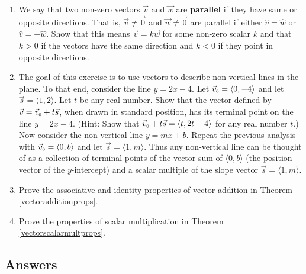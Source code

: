 \documentclass{ximera}
\begin{document}
\begin{enumerate}
\item We say that two non-zero vectors $\vec{v}$ and $\vec{w}$ are {\bf parallel} if they have same or opposite directions.  That is, $\vec{v} \neq \vec{0}$ and $\vec{w} \neq \vec{0}$ are parallel if either $\hat{v} = \hat{w}$ or $\hat{v} = -\hat{w}$.  Show that this means $\vec{v} = k\vec{w}$ for some non-zero scalar $k$ and that $k > 0$ if the vectors have the same direction and $k < 0$ if they point in opposite directions.
\label{parallelvectorexercise}

\item The goal of this exercise is to use vectors to describe non-vertical lines in the plane.  To that end, consider the line $y = 2x - 4$. Let $\vec{v}_{\text{\tiny $0$}} = \langle 0, -4 \rangle$ and let $\vec{s} = \langle 1, 2 \rangle$.  Let $t$ be any real number.  Show that the vector defined by $\vec{v} = \vec{v}_{\text{\tiny $0$}} + t\vec{s}$, when drawn in standard position, has its terminal point on the line $y = 2x - 4$.  (Hint: Show that $\vec{v}_{\text{\tiny $0$}} + t\vec{s} = \langle t, 2t - 4 \rangle$ for any real number $t$.)  Now consider the non-vertical line $y = mx + b$.  Repeat the previous analysis with  $\vec{v}_{\text{\tiny $0$}} = \langle 0, b \rangle$ and let $\vec{s} = \langle 1, m \rangle$.  Thus any non-vertical line can be thought of as a collection of terminal points of the vector sum of $\langle 0, b \rangle$ (the position vector of the $y$-intercept) and a scalar multiple of the slope vector $\vec{s} = \langle 1, m \rangle$.
\label{2dvectorsgiveuslines} 

\item Prove the associative and identity properties of vector addition in Theorem \ref{vectoradditionprops}.

\item Prove the properties of scalar multiplication in Theorem \ref{vectorscalarmultprops}. 

\end{enumerate}

\newpage

\subsection{Answers}
\end{document}
